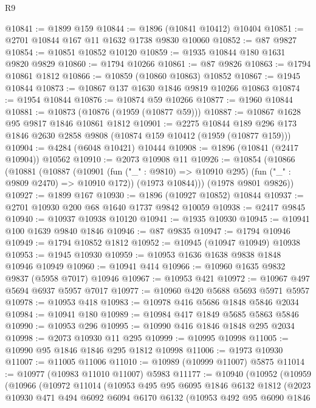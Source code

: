 \begin{lexlean}{R9}
\begin{coremodule}
@10841 := @1899 @159
@10844 := @1896 (@10841 @10412) @10404
@10851 := @2701 @10844 @167 @11 @1632 @1738 @9830 @10060
@10852 := @87 @9827
@10854 := @10851 @10852 @10120
@10859 := @1935 @10844 @180 @1631 @9820 @9829
@10860 := @1794 @10266
@10861 := @87 @9826
@10863 := @1794 @10861 @1812
@10866 := @10859 (@10860 @10863) @10852
@10867 := @1945 @10844
@10873 := @10867 @137 @1630 @1846 @9819 @10266 @10863
@10874 := @1954 @10844
@10876 := @10874 @59 @10266
@10877 := @1960 @10844
@10881 := @10873 (@10876 (@1959 (@10877 @59)))
@10887 := @10867 @1628 @95 @9817 @1846 @10861 @1812
@10901 := @2275
    @10844
    @189
    @296
    @173
    @1846
    @2630
    @2858
    @9808
    (@10874 @159 @10412 (@1959 (@10877 @159)))
@10904 := @4284 (@6048 @10421) @10444
@10908 := @1896 (@10841 (@2417 @10904)) @10562
@10910 := @2073 @10908 @11
@10926 := @10854
    (@10866
      (@10881
        (@10887
          (@10901 (fun ("_" : @9810) => @10910 @295) (fun ("_" : @9809 @2470) => @10910 @172))
          (@1973 @10844)))
      (@1978 @9801 @9826))
@10927 := @1899 @167
@10930 := @1896 (@10927 @10852) @10844
@10937 := @2701 @10930 @200 @68 @1640 @1737 @9842 @10059
@10938 := @2417 @9845
@10940 := @10937 @10938 @10120
@10941 := @1935 @10930
@10945 := @10941 @100 @1639 @9840 @1846
@10946 := @87 @9835
@10947 := @1794 @10946
@10949 := @1794 @10852 @1812
@10952 := @10945 (@10947 @10949) @10938
@10953 := @1945 @10930
@10959 := @10953 @1636 @1638 @9838 @1848 @10946 @10949
@10960 := @10941 @414
@10966 := @10960 @1635 @9832 @9837 (@5958 @7017) @10946
@10967 := @10953 @421
@10972 := @10967 @497 @5694 @6937 @5957 @7017
@10977 := @10960 @420 @5688 @5693 @5971 @5957
@10978 := @10953 @418
@10983 := @10978 @416 @5686 @1848 @5846 @2034
@10984 := @10941 @180
@10989 := @10984 @417 @1849 @5685 @5863 @5846
@10990 := @10953 @296
@10995 := @10990 @416 @1846 @1848 @295 @2034
@10998 := @2073 @10930 @11 @295
@10999 := @10995 @10998
@11005 := @10990 @95 @1846 @1846 @295 @1812 @10998
@11006 := @1973 @10930
@11007 := @11005 @11006
@11010 := @10989 (@10999 @11007) @5875
@11014 := @10977 (@10983 @11010 @11007) @5983
@11177 := @10940
    (@10952
      (@10959
        (@10966
          (@10972
            @11014
            (@10953
              @495
              @95
              @6095
              @1846
              @6132
              @1812
              (@2023
                @10930
                @471
                @494
                @6092
                @6094
                @6170
                @6132
                (@10953
                  @492
                  @95
                  @6090
                  @1846

\end{coremodule}
\end{lexlean}
